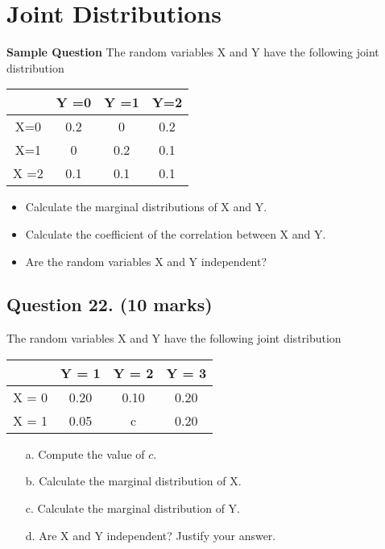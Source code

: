 
	\section{Joint Distributions}
	
	\textbf{Sample Question}
	The random variables X and Y have the following joint distribution
	
	
	\begin{tabular}{|c|c|c|c|}
		\hline
		
		& Y =0 & Y =1 & Y=2 \\
		\hline
		X=0 & 0.2 & 0 & 0.2 \\
		X=1 & 0 & 0.2 & 0.1 \\
		X
		=2 & 0.1 & 0.1 & 0.1 \\
		\hline
	\end{tabular}
	
	\begin{itemize}
		\item Calculate the marginal distributions of X and Y. \item
		Calculate the coefficient of the correlation between X and Y.
		\item Are the random variables X and Y independent?
	\end{itemize}
	
	\newpage
\subsection*{Question 22. (10 marks) } 
The random variables X and Y have the following joint distribution
\begin{center}
	\begin{tabular}{|c|c|c|c|}
		\hline
		& Y = 1 & Y = 2 & Y = 3 \\ \hline
		X = 0 & 0.20 & 0.10 & 0.20 \\ \hline
		X = 1 & 0.05 & c & 0.20 \\
		\hline
	\end{tabular}
\end{center}

\begin{itemize}
	\item[a.] Compute the value of $c$.
	\item[b.] Calculate the marginal distribution of X.
	\item[c.] Calculate the marginal distribution of Y.
	\item[d.] Are X and Y independent? Justify your answer.
\end{itemize}




